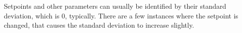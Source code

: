 Setpoints and other parameters can usually be identified by their standard deviation, which is 0, typically.  There are a few instances where 
the setpoint is changed, that causes the standard deviation to increase slightly.

%
%











